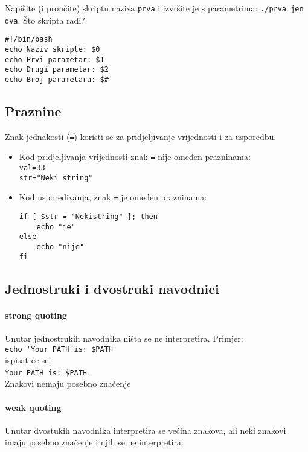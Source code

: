 \begin{zadatak}
Napišite (i proučite) skriptu naziva \texttt{prva} i izvršite je s parametrima: \texttt{./prva jen dva}. Što skripta radi?
\begin{lstlisting}
#!/bin/bash
echo Naziv skripte: $0
echo Prvi parametar: $1
echo Drugi parametar: $2
echo Broj parametara: $#
\end{lstlisting}
\end{zadatak}

\subsection*{Praznine}
Znak jednakosti (\lstinline!=!) koristi se za pridjeljivanje vrijednosti i za usporedbu.
\begin{itemize}
\item 
Kod pridjeljivanja vrijednosti znak \lstinline!=! nije omeđen prazninama:\\ 
\lstinline!val=33! \\
\lstinline!str="Neki string"!

\item Kod uspoređivanja, znak \texttt{=} je omeđen prazninama:
\begin{lstlisting}
if [ $str = "Nekistring" ]; then 
	echo "je"
else 
	echo "nije"
fi
\end{lstlisting}
\end{itemize}

\subsection*{Jednostruki i dvostruki navodnici}

\paragraph{strong quoting} Unutar jednostrukih navodnika ništa se ne interpretira. Primjer: \\ \lstinline!echo 'Your PATH is: $PATH' ! \\ 
ispisat će se: \\
\lstinline!Your PATH is: $PATH!. \\
Znakovi nemaju posebno značenje

\paragraph{weak quoting} Unutar dvostukih navodnika interpretira se većina znakova, ali neki znakovi imaju posebno značenje i njih se ne interpretira:

